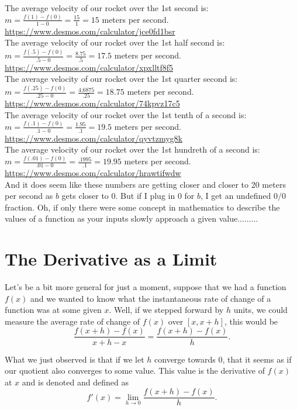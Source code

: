 \documentclass[10pt]{article}
\theoremstyle{definition}
\newcommand{\limit}[2]{\displaystyle{ \lim_{#1 \to #2}}}
\begin{document}
The average velocity of our rocket over the 1st second is: $m=\frac{f(1)-f(0)}{1-0}=\frac{15}{1}=15$ meters per second. \url{https://www.desmos.com/calculator/jce0fd1bsr}\\

The average velocity of our rocket over the 1st half second is: $m=\frac{f(.5)-f(0)}{.5-0}=\frac{8.75}{.5}=17.5$ meters per second. \url{https://www.desmos.com/calculator/xpxlltf8f5}\\

The average velocity of our rocket over the 1st quarter second is: $m=\frac{f(.25)-f(0)}{.25-0}=\frac{4.6875}{.25}=18.75$ meters per second. \url{https://www.desmos.com/calculator/74kpvz17c5}\\

The average velocity of our rocket over the 1st tenth of a second is: $m=\frac{f(.1)-f(0)}{.1-0}=\frac{1.95}{.1}=19.5$ meters per second. \url{https://www.desmos.com/calculator/qyvtzmyg8k}\\

The average velocity of our rocket over the 1st hundreth of a second is: $m=\frac{f(.01)-f(0)}{.01-0}=\frac{.1995}{.1}=19.95$ meters per second. \url{https://www.desmos.com/calculator/hrawtifwdw}\\


And it does seem like these numbers are getting closer and closer to 20 meters per second as $b$ gets closer to 0.  But if I plug in $0$ for $b$, I get an undefined $0/0$ fraction.  Oh, if only there were some concept in mathematics to describe the values of a function as your inputs slowly approach a given value.........

\section{The Derivative as a Limit}

Let's be a bit more general for just a moment, suppose that we had a function $f(x)$ and we wanted to know what the instantaneous rate of change of a function was at some given $x$.  Well, if we stepped forward by $h$ units, we could measure the average rate of change of $f(x)$ over $[x, x+h]$, this would be $$\frac{f(x+h)-f(x)}{x+h-x}=\frac{f(x+h)-f(x)}{h}.$$

What we just observed is that if we let $h$ converge towards 0, that it seems as if our quotient also converges to some value.  This value is the derivative of $f(x)$ at $x$ and is denoted and defined as $$f'(x)=\limit{h}{0}\frac{f(x+h)-f(x)}{h}.$$
\end{document}
